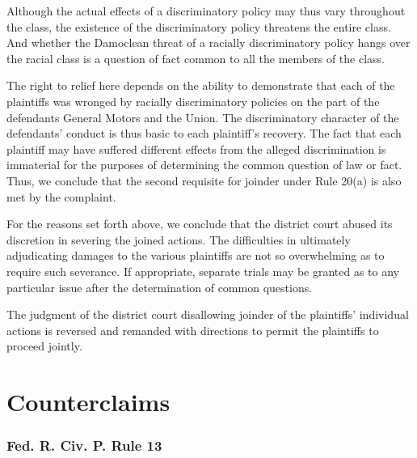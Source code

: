 \documentclass[11pt,letterpaper,twoside]{article}
\renewenvironment{quote}{%
   \list{}{%
     \leftmargin2em   %
     \rightmargin\leftmargin\parsep .1em }
   \item\relax
}
{\endlist}
\begin{document}
\begin{quote}
Although the actual effects of a discriminatory policy may thus vary
throughout the class, the existence of the discriminatory policy
threatens the entire class. And whether the Damoclean threat of a
racially discriminatory policy hangs over the racial class is a question
of fact common to all the members of the class.
\end{quote}

The right to relief here depends on the ability to demonstrate that each
of the plaintiffs was wronged by racially discriminatory policies on the
part of the defendants General Motors and the Union. The discriminatory
character of the defendants' conduct is thus basic to each plaintiff's
recovery. The fact that each plaintiff may have suffered different
effects from the alleged discrimination is immaterial for the purposes
of determining the common question of law or fact. Thus, we conclude
that the second requisite for joinder under Rule 20(a) is also met by
the complaint.

For the reasons set forth above, we conclude that the district court
abused its discretion in severing the joined actions. The difficulties
in ultimately adjudicating damages to the various plaintiffs are not so
overwhelming as to require such severance. If appropriate, separate
trials may be granted as to any particular issue after the determination
of common questions.

The judgment of the district court disallowing joinder of the
plaintiffs' individual actions is reversed and remanded with directions
to permit the plaintiffs to proceed jointly.

\section{Counterclaims}\label{counterclaims}

\subsubsection{Fed. R. Civ. P. Rule 13}\label{fedciv_rule13}
\end{document}
